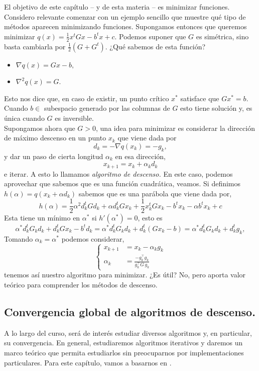 \documentclass[11pt]{article}
\theoremstyle{ejstyle}
\theoremstyle{ejstyle}
\theoremstyle{ejstyle}
\theoremstyle{ejstyle}
\theoremstyle{ejstyle}
\theoremstyle{ejstyle}
\theoremstyle{ejstyle}
\begin{document}
 	El objetivo de este capítulo -- y de esta materia -- es minimizar funciones. Considero relevante comenzar con un ejemplo sencillo que muestre qué tipo de métodos aparecen minimizando funciones. Supongamos entonces que queremos minimizar $q(x) = \frac{1}{2} x^t G x - b^t x + c$. Podemos suponer que $G$ es simétrica, sino basta cambiarla por $\frac{1}{2} (G + G^t).$ ¿Qué sabemos de esta función?
	\begin{itemize}
		\item $\nabla q(x) = Gx - b,$
		\item $\nabla^2 q(x) = G.$ 
	\end{itemize}
	Esto nos dice que, en caso de existir, un punto crítico $x^*$ satisface que $Gx^* = b$. Cuando
	$b\in$ subespacio generado por las columnas de $G$ esto tiene solución y, es única cuando $G$ es inversible. \\
	\indent Supongamos ahora que $G > 0$, una idea para minimizar es considerar la dirección de máximo descenso en un punto $x_k$ que viene dada por 
	$$d_k = - \nabla q(x_k) = - g_k,$$
	y dar un paso de cierta longitud $\alpha_k$ en esa dirección, 
	$$ 
	x_{k+1} = x_{k} + \alpha_{k} d_k
	$$
	e iterar. A esto lo llamamos \emph{algoritmo de descenso.} En este caso, podemos aprovechar que sabemos que es una función cuadrática, veamos. Si definimos $h(\alpha) = q(x_k + \alpha d_k)$ sabemos que es una parábola que viene dada por,
	$$
	h(\alpha) = \frac{1}{2} \alpha^2 d_k^t G d_k + \alpha d_k^t G x_k + \frac{1}{2} x_k^t G x_k - b^t x_k - \alpha b^t x_k + c 
   	$$
   	Esta tiene un mínimo en $\alpha^*$ si $h'(\alpha^*) = 0$, esto es 
   	$$
   	\alpha^* d_k^t G_k d_k + d_k^t G x_k - b^t d_k = \alpha^* d_k^t G_k d_k + d_k^t(G x_k - b) = \alpha^* d_k^t G_k d_k + d_k^tg_k,
    $$	
    Tomando $\alpha_k = \alpha^*$ podemos considerar,
	\[
	\left\{
	\begin{aligned}
		x_{k+1} &= x_k - \alpha_k g_k \\
		\alpha_k &= \frac{- g_k^\top g_k}{g_k^\top G \, g_k}
	\end{aligned}
	\right.
	\]
	tenemos así nuestro algoritmo para minimizar. ¿Es útil? No, pero aporta valor teórico para comprender los métodos de descenso.
	
	\subsection{Convergencia global de algoritmos de descenso.}
	
	A lo largo del curso, será de interés estudiar diversos algoritmos y, en particular, su convergencia. En general, estudiaremos algoritmos iterativos y daremos un marco teórico que permita estudiarlos sin preocuparnos por implementaciones particulares. Para este capítulo, vamos a basarnos en \cite{luenberger2008nonlinear}.
	
\end{document}

